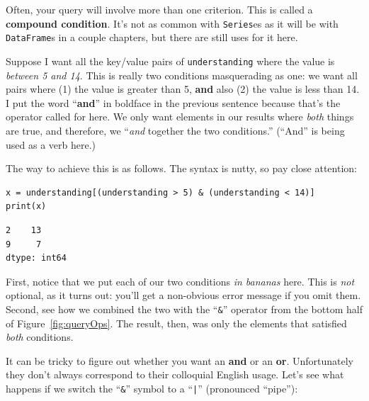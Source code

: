 \label{seriesCompoundQueries}

Often, your query will involve more than one criterion. This is called a
\textbf{compound condition}. It's not as common with \texttt{Series}es as it
will be with \texttt{DataFrame}s in a couple chapters, but there are still uses
for it here.


Suppose I want all the key/value pairs of \texttt{understanding} where the
value is \textit{between 5 and 14}. This is really two conditions masquerading
as one: we want all pairs where (1) the value is greater than 5, \textbf{and}
also (2) the value is less than 14. I put the word ``\textbf{and}'' in boldface
in the previous sentence because that's the operator called for here. We only
want elements in our results where \textit{both} things are true, and
therefore, we ``\textit{and} together the two conditions.'' (``And'' is being
used as a verb here.)

The way to achieve this is as follows. The syntax is nutty, so pay close
attention:

\begin{Verbatim}[fontsize=\footnotesize,samepage=true,frame=single,framesep=3mm]
x = understanding[(understanding > 5) & (understanding < 14)]
print(x)
\end{Verbatim}

\begin{Verbatim}[fontsize=\small,samepage=true,frame=leftline,framesep=5mm,framerule=1mm]
2    13
9     7
dtype: int64
\end{Verbatim}

First, notice that we put each of our two conditions \textit{in bananas} here.
This is \textit{not} optional, as it turns out: you'll get a non-obvious error
message if you omit them. Second, see how we combined the two with the
``\texttt{\&}'' operator from the bottom half of Figure~\ref{fig:queryOps}. The
result, then, was only the elements that satisfied \textit{both} conditions.


It can be tricky to figure out whether you want an \textbf{and} or an
\textbf{or}. Unfortunately they don't always correspond to their colloquial
English usage. Let's see what happens if we switch the ``\texttt{\&}'' symbol to
a ``\texttt{|}'' (pronounced ``pipe''):

